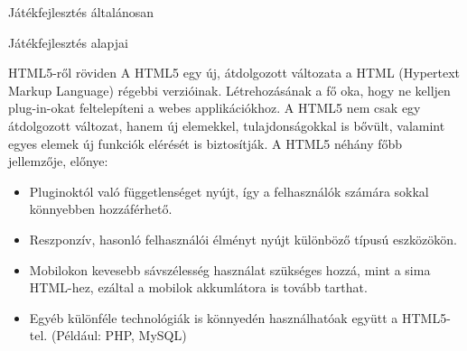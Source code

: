 \begin{MyChapter}{Játékfejlesztés általánosan}
\begin{MySection}{Játékfejlesztés alapjai}
		\begin{MySubSection}{HTML5-ről röviden}
			A HTML5 egy új, átdolgozott változata a HTML (Hypertext Markup Language) régebbi verzióinak. Létrehozásának a fő oka, hogy ne kelljen plug-in-okat feltelepíteni a webes applikációkhoz. A HTML5 nem csak egy átdolgozott változat, hanem új elemekkel, tulajdonságokkal is bővült, valamint egyes elemek új funkciók elérését is biztosítják.
			A HTML5 néhány főbb jellemzője, előnye:
			\begin{itemize}
				\item Pluginoktól való függetlenséget nyújt, így a felhasználók számára sokkal könnyebben hozzáférhető.
				\item Reszponzív, hasonló felhasználói élményt nyújt különböző típusú eszközökön.
				\item Mobilokon kevesebb sávszélesség használat szükséges hozzá, mint a sima HTML-hez, ezáltal a mobilok akkumlátora is tovább tarthat.
				\item Egyéb különféle technológiák is könnyedén használhatóak együtt a HTML5-tel. (Például: PHP, MySQL)
			\end{itemize}
		\end{MySubSection}
	

\end{MySection}
\end{MyChapter}
